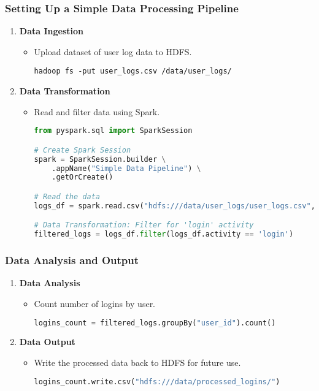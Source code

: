 \documentclass[aspectratio=169]{beamer}
\begin{document}
\begin{frame}[fragile]
    \frametitle{Setting Up a Simple Data Processing Pipeline}
    \begin{enumerate}
        \item \textbf{Data Ingestion}
        \begin{itemize}
            \item Upload dataset of user log data to HDFS.
            \begin{lstlisting}
hadoop fs -put user_logs.csv /data/user_logs/
            \end{lstlisting}
        \end{itemize}

        \item \textbf{Data Transformation}
        \begin{itemize}
            \item Read and filter data using Spark.
            \begin{lstlisting}[language=Python]
from pyspark.sql import SparkSession

# Create Spark Session
spark = SparkSession.builder \
    .appName("Simple Data Pipeline") \
    .getOrCreate()

# Read the data
logs_df = spark.read.csv("hdfs:///data/user_logs/user_logs.csv", header=True, inferSchema=True)

# Data Transformation: Filter for 'login' activity
filtered_logs = logs_df.filter(logs_df.activity == 'login')
            \end{lstlisting}
        \end{itemize}
    \end{enumerate}
\end{frame}

\begin{frame}[fragile]
    \frametitle{Data Analysis and Output}
    \begin{enumerate}[resume]
        \item \textbf{Data Analysis}
        \begin{itemize}
            \item Count number of logins by user.
            \begin{lstlisting}[language=Python]
logins_count = filtered_logs.groupBy("user_id").count()
            \end{lstlisting}
        \end{itemize}

        \item \textbf{Data Output}
        \begin{itemize}
            \item Write the processed data back to HDFS for future use.
            \begin{lstlisting}[language=Python]
logins_count.write.csv("hdfs:///data/processed_logins/")
            \end{lstlisting}
        \end{itemize}
    \end{enumerate}
\end{frame}
\end{document}
